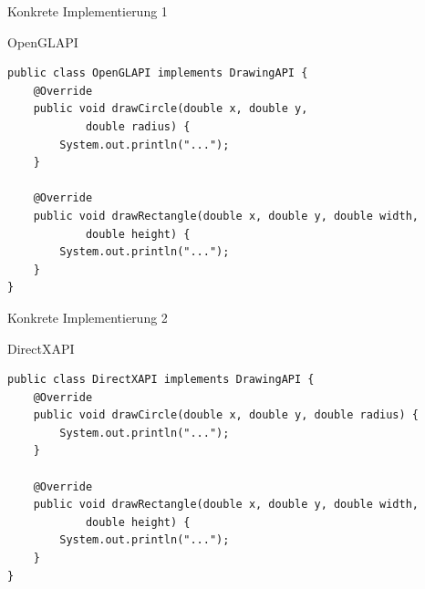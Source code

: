 \begin{frame}[fragile]{Konkrete Implementierung 1}
	\begin{exampleblock}{OpenGLAPI}
 		\begin{lstlisting}
public class OpenGLAPI implements DrawingAPI {
    @Override
    public void drawCircle(double x, double y, 
            double radius) {
        System.out.println("...");
    }

    @Override
    public void drawRectangle(double x, double y, double width, 
            double height) {
        System.out.println("...");
    }
}
 		\end{lstlisting}
 	\end{exampleblock}
\end{frame}

\begin{frame}[fragile]{Konkrete Implementierung 2}
	\begin{exampleblock}{DirectXAPI}
 		\begin{lstlisting}
public class DirectXAPI implements DrawingAPI {
    @Override
    public void drawCircle(double x, double y, double radius) {
        System.out.println("...");
    }

    @Override
    public void drawRectangle(double x, double y, double width, 
            double height) {
        System.out.println("...");
    }
}
 		\end{lstlisting}
 	\end{exampleblock}
\end{frame}

